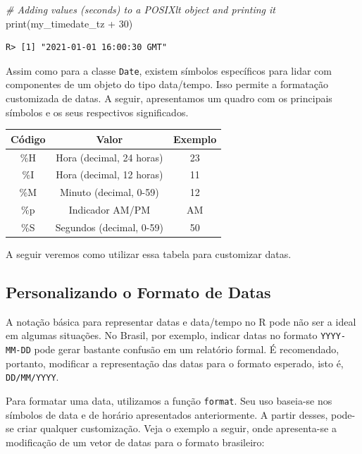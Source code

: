 \documentclass[
  11pt,
]{book}
\newenvironment{Shaded}{\begin{snugshade}}{\end{snugshade}}
\newcommand{\CommentTok}[1]{\textcolor[rgb]{0.37,0.37,0.37}{\textit{#1}}}
\newcommand{\DecValTok}[1]{\textcolor[rgb]{0.06,0.06,0.06}{#1}}
\newcommand{\FunctionTok}[1]{\textcolor[rgb]{0,0,0}{#1}}
\newcommand{\NormalTok}[1]{#1}
\newcommand{\SpecialCharTok}[1]{\textcolor[rgb]{0,0,0}{#1}}
\begin{document}
\begin{Shaded}
\begin{Highlighting}[]
\CommentTok{\# Adding values (seconds) to a POSIXlt object and printing it}
\FunctionTok{print}\NormalTok{(my\_timedate\_tz }\SpecialCharTok{+} \DecValTok{30}\NormalTok{)}
\end{Highlighting}
\end{Shaded}

\begin{verbatim}
R> [1] "2021-01-01 16:00:30 GMT"
\end{verbatim}

Assim como para a classe \texttt{Date}, existem símbolos específicos para lidar com componentes de um objeto do tipo data/tempo. Isso permite a formatação customizada de datas. A seguir, apresentamos um quadro com os principais símbolos e os seus respectivos significados.

\begin{longtable}[]{@{}ccc@{}}
\toprule()
Código & Valor & Exemplo \\
\midrule()
\endhead
\%H & Hora (decimal, 24 horas) & 23 \\
\%I & Hora (decimal, 12 horas) & 11 \\
\%M & Minuto (decimal, 0-59) & 12 \\
\%p & Indicador AM/PM & AM \\
\%S & Segundos (decimal, 0-59) & 50 \\
\bottomrule()
\end{longtable}

A seguir veremos como utilizar essa tabela para customizar datas.

\hypertarget{personalizando-o-formato-de-datas}{%
\subsection{Personalizando o Formato de Datas}\label{personalizando-o-formato-de-datas}}

A notação básica para representar datas e data/tempo no R pode não ser a ideal em algumas situações. No Brasil, por exemplo, indicar datas no formato \texttt{YYYY-MM-DD} pode gerar bastante confusão em um relatório formal. É recomendado, portanto, modificar a representação das datas para o formato esperado, isto é, \texttt{DD/MM/YYYY}.

Para formatar uma data, utilizamos a função \texttt{format}. Seu uso baseia-se nos símbolos de data e de horário apresentados anteriormente. A partir desses, pode-se criar qualquer customização. Veja o exemplo a seguir, onde apresenta-se a modificação de um vetor de datas para o formato brasileiro:
\end{document}
